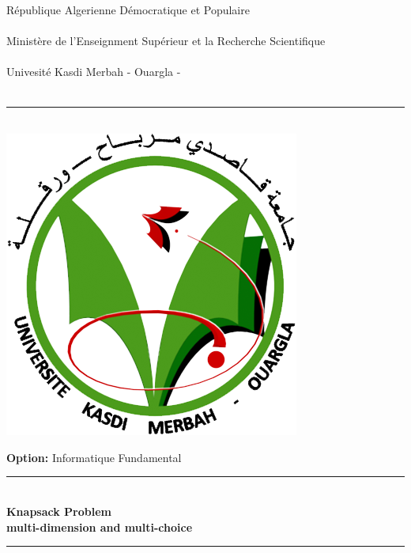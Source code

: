     \begin{center}
        {\large République Algerienne Démocratique et Populaire}\\
        {\large {}\\}
        {\large Ministère de l'Enseignment Supérieur et la Recherche Scientifique}\\
        {\large {}\\}
       {\large Univesité Kasdi Merbah - Ouargla -}\\
        {\large {}\\}
        \rule{.66\linewidth}{1pt}\\\vfill
        \includegraphics[scale=0.2]{logo_univ.png}\vfill

        {\LARGE \textbf{Option:} Informatique Fundamental}\\\vfill
        \rule{.66\linewidth}{2pt}\\
        \textbf{\LARGE Knapsack Problem\\}
        \textbf{\Large multi-dimension and multi-choice}
        \rule {.66\linewidth}{2pt}\vfill
    \end{center}
